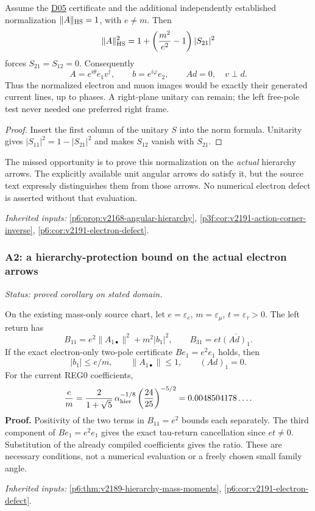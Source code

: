\documentclass[12pt,a4paper]{article}
\begin{document}
Assume the \hyperref[p6:sec:v2201-derived-d05]{D05} certificate and the additional independently established
normalization $\|A\|_{\rm HS}=1$, with $e\ne m$. Then
\[
 \|A\|_{\rm HS}^2
 =1+\left(\frac{m^2}{e^2}-1\right)|S_{21}|^2
\]
forces $S_{21}=S_{12}=0$. Consequently
\[
 A=e^{i\theta}e_1v^\dagger,\qquad b=e^{i\varphi}e_2,
 \qquad Ad=0,\quad v\perp d.
\]
Thus the normalized electron and muon images would be exactly their
generated current lines, up to phases. A right-plane unitary can remain;
the left free-pole test never needed one preferred right frame.
\begin{proof}
Insert the first column of the unitary $S$ into the norm formula.
Unitarity gives $|S_{11}|^2=1-|S_{21}|^2$ and makes $S_{12}$ vanish with
$S_{21}$.
\end{proof}
The missed opportunity is to prove this normalization on the \emph{actual}
hierarchy arrows. The explicitly available unit angular arrows do satisfy
it, but the source text expressly distinguishes them from those arrows.
No numerical electron defect is asserted without that evaluation.
\par\noindent\textit{Inherited inputs:} \ref{p6:prop:v2168-angular-hierarchy}, \ref{p3f:cor:v2191-action-corner-inverse}, \ref{p6:cor:v2191-electron-defect}.

\subsubsection{A2: a hierarchy-protection bound on the actual electron arrows}
\label{p6:sec:v2201-derived-a2}
\noindent\textit{Status: proved corollary on stated domain.}

On the existing mass-only source chart, let
\(e=\varepsilon_e\), \(m=\varepsilon_\mu\), \(t=\varepsilon_\tau>0\).
The left return has
\[
B_{11}=e^2\|A_{1\bullet}\|^2+m^2|b_1|^2,
\qquad B_{31}=et\overline{(Ad)_1}.
\]
If the exact electron-only two-pole certificate \(Be_1=e^2e_1\) holds, then
\[
\boxed{|b_1|\le e/m,\qquad \|A_{1\bullet}\|\le1,\qquad(Ad)_1=0.}
\]
For the current REG0 coefficients,
\[
\frac em=\frac{2}{1+\sqrt5}\,
\alpha_{\rm hier}^{-1/8}\left(\frac{24}{25}\right)^{-5/2}
=0.0048504178\ldots.
\]
\textbf{Proof.} Positivity of the two terms in \(B_{11}=e^2\) bounds each
separately. The third component of \(Be_1=e^2e_1\) gives the exact tau-return
cancellation since \(et\ne0\). Substitution of the already compiled
coefficients gives the ratio. These are necessary conditions, not a
numerical evaluation or a freely chosen small family angle.
\par\noindent\textit{Inherited inputs:} \ref{p6:thm:v2189-hierarchy-mass-moments}, \ref{p6:cor:v2191-electron-defect}.
\end{document}
